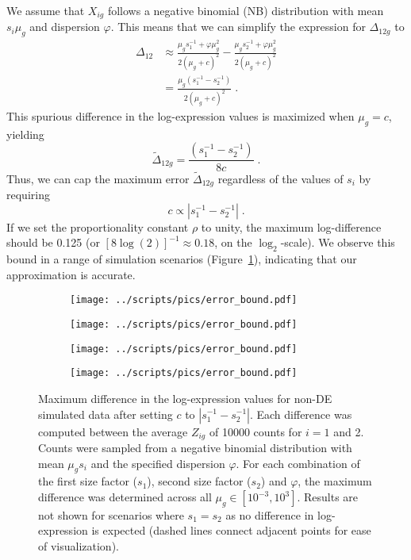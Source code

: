 \documentclass[10pt,letterpaper]{article}
\begin{document}
We assume that $X_{ig}$ follows a negative binomial (NB) distribution with mean $s_i\mu_g$ and dispersion $\varphi$.
This means that we can simplify the expression for $\Delta_{12g}$ to
\begin{align*}
\Delta_{12} 
&\approx \frac{\mu_g s_1^{-1} + \varphi \mu_g^2}{2(\mu_g + c)^2} - \frac{\mu_g s_2^{-1} + \varphi \mu_g^2}{2(\mu_g + c)^2} \\ 
&= \frac{\mu_g (s_1^{-1} - s_2^{-1})}{2(\mu_g + c)^2} \;.
\end{align*}
This spurious difference in the log-expression values is maximized when $\mu_g = c$, yielding 
\[
\tilde\Delta_{12g} = \frac{(s_1^{-1} - s_2^{-1})}{8c} \;.
\]
Thus, we can cap the maximum error $\tilde\Delta_{12g}$ regardless of the values of $s_i$ by requiring 
\[
    c \propto |s_1^{-1} - s_2^{-1}| \;.
\]
If we set the proportionality constant $\rho$ to unity, the maximum log-difference should be 0.125 (or $[8\log(2)]^{-1} \approx 0.18$, on the $\log_2$-scale).
We observe this bound in a range of simulation scenarios (Figure~\ref{fig:cappederr}), indicating that our approximation is accurate.

\begin{figure}[btp]
\centering
\begin{subfigure}[b]{0.49\textwidth}
    \texttt{[image: ../scripts/pics/error\_bound.pdf]}
    \caption{}
\end{subfigure}
\begin{subfigure}[b]{0.49\textwidth}
    \texttt{[image: ../scripts/pics/error\_bound.pdf]}
    \caption{}
\end{subfigure}
\begin{subfigure}[b]{0.49\textwidth}
    \texttt{[image: ../scripts/pics/error\_bound.pdf]}
    \caption{}
\end{subfigure}
\begin{subfigure}[b]{0.49\textwidth}
    \texttt{[image: ../scripts/pics/error\_bound.pdf]}
    \caption{}
\end{subfigure}
\caption{Maximum difference in the log-expression values for non-DE simulated data after setting $c$ to $|s_1^{-1} - s_2^{-1}|$.
Each difference was computed between the average $Z_{ig}$ of 10000 counts for $i=1$ and 2.
Counts were sampled from a negative binomial distribution with mean $\mu_g s_i$ and the specified dispersion $\varphi$.
For each combination of the first size factor ($s_1$), second size factor ($s_2$) and $\varphi$, the maximum difference was determined across all $\mu_g \in [10^{-3}, 10^3]$.
Results are not shown for scenarios where $s_1=s_2$ as no difference in log-expression is expected (dashed lines connect adjacent points for ease of visualization).
}
\label{fig:cappederr}
\end{figure}
\end{document}
